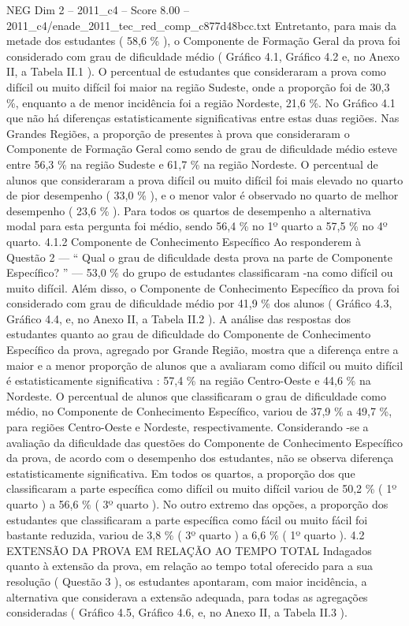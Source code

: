 \begin{textsample}{NEG Dim 2 – 2011\_c4 – Score 8.00 – 2011\_c4/enade\_2011\_tec\_red\_comp\_c877d48bcc.txt}
Entretanto, para mais da metade dos estudantes ( 58,6 \% ), o Componente de Formação Geral da prova foi considerado com grau de dificuldade médio ( Gráfico 4.1, Gráfico 4.2 e, no Anexo II, a Tabela II.1 ).
O percentual de estudantes que consideraram a prova como difícil ou muito difícil foi maior na região Sudeste, onde a proporção foi de 30,3 \%, enquanto a de menor incidência foi a região Nordeste, 21,6 \%.
No Gráfico 4.1 que não há diferenças estatisticamente significativas entre estas duas regiões.
Nas Grandes Regiões, a proporção de presentes à prova que consideraram o Componente de Formação Geral como sendo de grau de dificuldade médio esteve entre 56,3 \% na região Sudeste e 61,7 \% na região Nordeste.
O percentual de alunos que consideraram a prova difícil ou muito difícil foi mais elevado no quarto de pior desempenho ( 33,0 \% ), e o menor valor é observado no quarto de melhor desempenho ( 23,6 \% ).
Para todos os quartos de desempenho a alternativa modal para esta pergunta foi médio, sendo 56,4 \% no 1º quarto a 57,5 \% no 4º quarto. 4.1.2 Componente de Conhecimento Específico Ao responderem à Questão 2 — “ Qual o grau de dificuldade desta prova na parte de Componente Específico? ” — 53,0 \% do grupo de estudantes classificaram -na como difícil ou muito difícil.
Além disso, o Componente de Conhecimento Específico da prova foi considerado com grau de dificuldade médio por 41,9 \% dos alunos ( Gráfico 4.3, Gráfico 4.4, e, no Anexo II, a Tabela II.2 ).
A análise das respostas dos estudantes quanto ao grau de dificuldade do Componente de Conhecimento Específico da prova, agregado por Grande Região, mostra que a diferença entre a maior e a menor proporção de alunos que a avaliaram como difícil ou muito difícil é estatisticamente significativa : 57,4 \% na região Centro-Oeste e 44,6 \% na Nordeste.
O percentual de alunos que classificaram o grau de dificuldade como médio, no Componente de Conhecimento Específico, variou de 37,9 \% a 49,7 \%, para regiões Centro-Oeste e Nordeste, respectivamente.
Considerando -se a avaliação da dificuldade das questões do Componente de Conhecimento Específico da prova, de acordo com o desempenho dos estudantes, não se observa diferença estatisticamente significativa.
Em todos os quartos, a proporção dos que classificaram a parte específica como difícil ou muito difícil variou de 50,2 \% ( 1º quarto ) a 56,6 \% ( 3º quarto ).
No outro extremo das opções, a proporção dos estudantes que classificaram a parte específica como fácil ou muito fácil foi bastante reduzida, variou de 3,8 \% ( 3º quarto ) a 6,6 \% ( 1º quarto ). 4.2 EXTENSÃO DA PROVA EM RELAÇÃO AO TEMPO TOTAL Indagados quanto à extensão da prova, em relação ao tempo total oferecido para a sua resolução ( Questão 3 ), os estudantes apontaram, com maior incidência, a alternativa que considerava a extensão adequada, para todas as agregações consideradas ( Gráfico 4.5, Gráfico 4.6, e, no Anexo II, a Tabela II.3 ).

\end{textsample}
